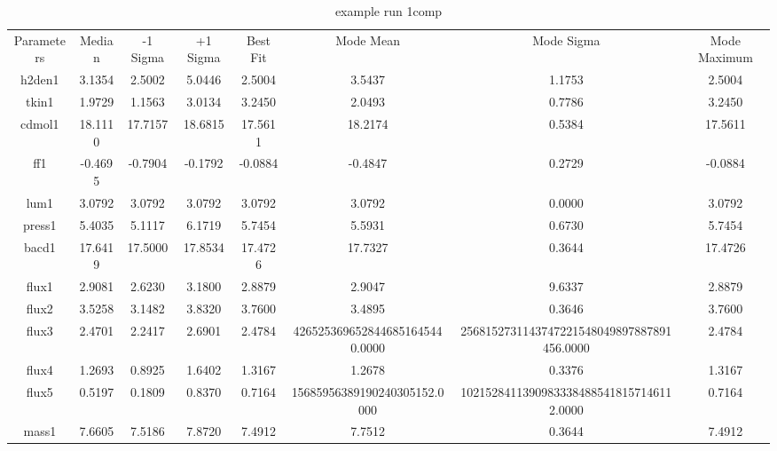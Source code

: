 \begin{table}
\caption{example run 1comp}
\begin{tabular}{cccccccc}
Parameters & Median & -1 Sigma & +1 Sigma & Best Fit & Mode Mean & Mode Sigma & Mode Maximum \\
h2den1 & 3.1354 & 2.5002 & 5.0446 & 2.5004 & 3.5437 & 1.1753 & 2.5004 \\
tkin1 & 1.9729 & 1.1563 & 3.0134 & 3.2450 & 2.0493 & 0.7786 & 3.2450 \\
cdmol1 & 18.1110 & 17.7157 & 18.6815 & 17.5611 & 18.2174 & 0.5384 & 17.5611 \\
ff1 & -0.4695 & -0.7904 & -0.1792 & -0.0884 & -0.4847 & 0.2729 & -0.0884 \\
lum1 & 3.0792 & 3.0792 & 3.0792 & 3.0792 & 3.0792 & 0.0000 & 3.0792 \\
press1 & 5.4035 & 5.1117 & 6.1719 & 5.7454 & 5.5931 & 0.6730 & 5.7454 \\
bacd1 & 17.6419 & 17.5000 & 17.8534 & 17.4726 & 17.7327 & 0.3644 & 17.4726 \\
flux1 & 2.9081 & 2.6230 & 3.1800 & 2.8879 & 2.9047 & 9.6337 & 2.8879 \\
flux2 & 3.5258 & 3.1482 & 3.8320 & 3.7600 & 3.4895 & 0.3646 & 3.7600 \\
flux3 & 2.4701 & 2.2417 & 2.6901 & 2.4784 & 4265253696528446851645440.0000 & 2568152731143747221548049897887891456.0000 & 2.4784 \\
flux4 & 1.2693 & 0.8925 & 1.6402 & 1.3167 & 1.2678 & 0.3376 & 1.3167 \\
flux5 & 0.5197 & 0.1809 & 0.8370 & 0.7164 & 15685956389190240305152.0000 & 10215284113909833384885418157146112.0000 & 0.7164 \\
mass1 & 7.6605 & 7.5186 & 7.8720 & 7.4912 & 7.7512 & 0.3644 & 7.4912 \\
\end{tabular}
\end{table}
